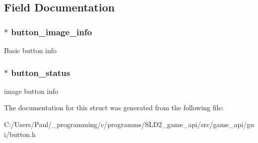 \subsection{Field Documentation}
\hypertarget{struct___image___button_abe7ec1033c8966c23ea31920649178bf}{
\subsubsection[{button\+\_\+image\+\_\+info}]{$\ast$ button\+\_\+image\+\_\+info}}\label{struct___image___button_abe7ec1033c8966c23ea31920649178bf}
Basic button info \hypertarget{struct___image___button_af1ab6c7287e67a55a8e855e08302f8be}{
\subsubsection[{button\+\_\+status}]{$\ast$ button\+\_\+status}}\label{struct___image___button_af1ab6c7287e67a55a8e855e08302f8be}
image button info 

The documentation for this struct was generated from the following file\+:\begin{DoxyCompactItemize}
\item 
C\+:/\+Users/\+Paul/\+\_\+programming/c/programms/\+S\+L\+D2\+\_\+game\+\_\+api/src/game\+\_\+api/gui/button.\+h\end{DoxyCompactItemize}
